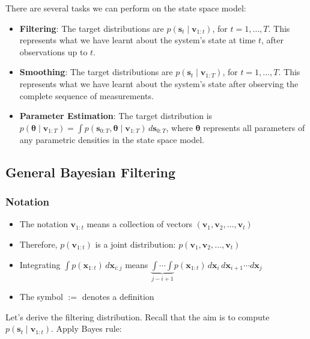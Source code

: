 \documentclass[11pt,a4paper]{article}
\begin{document}
There are several tasks we can perform on the state space model:

\begin{itemize}
\item \textbf{Filtering}: The target distributions are $p(\mathbf{s}_t \mid \mathbf{v}_{1:t})$, for $t = 1, \ldots, T$. This represents what we have learnt about the system's state at time $t$, after observations up to $t$.

\item \textbf{Smoothing}: The target distributions are $p(\mathbf{s}_t \mid \mathbf{v}_{1:T})$, for $t = 1, \ldots, T$. This represents what we have learnt about the system's state after observing the complete sequence of measurements.

\item \textbf{Parameter Estimation}: The target distribution is $p(\boldsymbol{\theta} \mid \mathbf{v}_{1:T}) = \int p(\mathbf{s}_{0:T}, \boldsymbol{\theta} \mid \mathbf{v}_{1:T}) \, d\mathbf{s}_{0:T}$, where $\boldsymbol{\theta}$ represents all parameters of any parametric densities in the state space model.
\end{itemize}

\subsection{General Bayesian Filtering}

\subsubsection{Notation}

\begin{itemize}[leftmargin=*]
\item The notation $\mathbf{v}_{1:t}$ means a collection of vectors $(\mathbf{v}_1, \mathbf{v}_2, \dots, \mathbf{v}_t)$
\item Therefore, $p(\mathbf{v}_{1:t})$ is a joint distribution: $p(\mathbf{v}_1, \mathbf{v}_2, \dots, \mathbf{v}_t)$
\item Integrating $\int p(\mathbf{x}_{1:t}) \, d\mathbf{x}_{i:j}$ means $\underbrace{\int \cdots \int}_{j-i+1} p(\mathbf{x}_{1:t}) \, d\mathbf{x}_i \, d\mathbf{x}_{i+1} \cdots d\mathbf{x}_j$
\item The symbol $:=$ denotes a definition
\end{itemize}

Let's derive the filtering distribution. Recall that the aim is to compute $p(\mathbf{s}_t \mid \mathbf{v}_{1:t})$. Apply Bayes rule:
\end{document}
